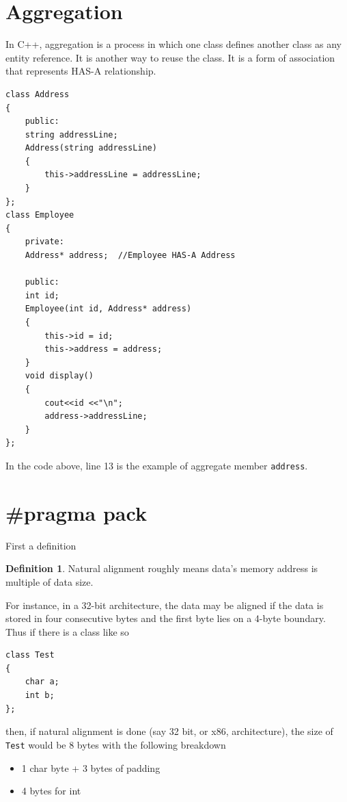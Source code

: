 \documentclass{article}
\theoremstyle{definition}
\newtheorem{definition}{Definition}[section]
\newenvironment{dummy}{}{}
\begin{document}
\section{Aggregation}
\label{sec:aggregation}
In C++, aggregation is a process in which one class defines another class as any entity reference. It is another way to reuse the class. It is a form of association that represents HAS-A relationship.

\begin{dummy}
\begin{lstlisting}[frame=single]
class Address
{  
    public:
    string addressLine;
    Address(string addressLine)
    {    
        this->addressLine = addressLine;
    }
};
class Employee
{
    private:
    Address* address;  //Employee HAS-A Address

    public:
    int id;
    Employee(int id, Address* address)
    {
        this->id = id;
        this->address = address;
    }
    void display()
    {
        cout<<id <<"\n";
        address->addressLine;
    }
};
\end{lstlisting}
\end{dummy}
In the code above, line 13 is the example of aggregate member \texttt{address}.

\section{\#pragma pack}
\label{append:pragma_pack}
First a definition

\begin{definition}
Natural alignment roughly means data's memory address is multiple of data size.
\end{definition}

For instance, in a 32-bit architecture, the data may be aligned if the data is stored in four consecutive bytes and the first byte lies on a 4-byte boundary.  
Thus if there is a class like so

\begin{lstlisting}[frame=single]
class Test
{
    char a;
    int b;
};
\end{lstlisting}

then, if natural alignment is done (say 32 bit, or x86, architecture), the size of \texttt{Test} would be 8 bytes with the following breakdown
\begin{itemize}
\item 1 char byte + 3 bytes of padding
\item 4 bytes for int
\end{itemize}
\end{document}
